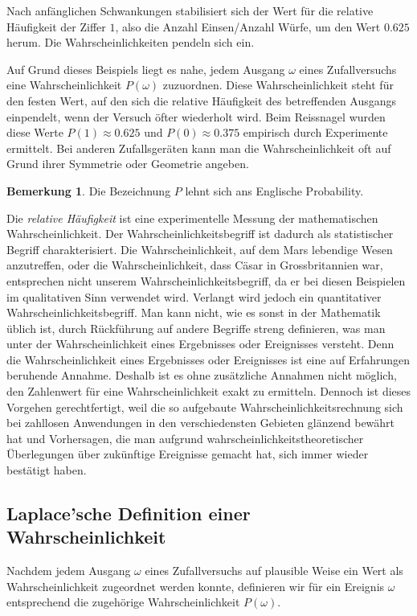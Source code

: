 \documentclass[%
<<<<<<< Updated upstream
11pt,%
twoside,%
titlepage,%
german,%
=======
11pt,%
twoside,%
titlepage,%
swissgerman,%
>>>>>>> Stashed changes
headsepline%
]{scrartcl}
\theoremstyle{definition}
\newtheorem{bem}{Bemerkung}[subsection] %
\theoremstyle{plain}
\newcounter{theo}[section]\setcounter{theo}{0}
\begin{document}
Nach anfänglichen Schwankungen stabilisiert sich der Wert für die relative Häufigkeit der Ziffer $1$, also die Anzahl Einsen/Anzahl Würfe, um den Wert $0.625$ herum. Die Wahrscheinlichkeiten \glqq pendeln sich ein\grqq.

Auf Grund dieses Beispiels liegt es nahe, jedem Ausgang $\omega$ eines Zufallversuchs eine Wahrscheinlichkeit $P(\omega)$ zuzuordnen. Diese Wahrscheinlichkeit steht für den festen Wert, auf den sich die relative Häufigkeit des betreffenden Ausgangs einpendelt, wenn der Versuch öfter wiederholt wird. Beim Reissnagel wurden diese Werte $P(1)\approx0.625$ und $P(0)\approx0.375$ empirisch durch Experimente ermittelt. Bei anderen Zufallsgeräten kann man die Wahrscheinlichkeit oft auf Grund ihrer Symmetrie oder Geometrie angeben.

\begin{bem}
Die Bezeichnung $P$ lehnt sich ans Englische Probability.
\end{bem}

Die \emph{relative Häufigkeit} ist eine experimentelle Messung der mathematischen Wahrscheinlichkeit. Der Wahrscheinlichkeitsbegriff ist dadurch als statistischer Begriff charakterisiert. Die Wahrscheinlichkeit, auf dem Mars lebendige Wesen anzutreffen, oder die Wahrscheinlichkeit, dass Cäsar in Grossbritannien war, entsprechen nicht unserem Wahrscheinlichkeitsbegriff, da er bei diesen Beispielen im qualitativen Sinn verwendet wird. Verlangt wird jedoch ein quantitativer Wahrscheinlichkeitsbegriff. Man kann nicht, wie es sonst in der Mathematik üblich ist, durch Rückführung auf andere Begriffe streng definieren, was man unter der Wahrscheinlichkeit eines Ergebnisses oder Ereignisses versteht. Denn die Wahrscheinlichkeit eines Ergebnisses oder Ereignisses ist eine auf Erfahrungen beruhende Annahme. Deshalb ist es ohne zusätzliche Annahmen nicht möglich, den Zahlenwert für eine Wahrscheinlichkeit exakt zu ermitteln. Dennoch ist dieses Vorgehen gerechtfertigt, weil die so aufgebaute Wahrscheinlichkeitsrechnung sich bei zahllosen Anwendungen in den verschiedensten Gebieten glänzend bewährt hat und Vorhersagen, die man aufgrund wahrscheinlichkeitstheoretischer Überlegungen über zukünftige Ereignisse gemacht hat, sich immer wieder bestätigt haben.

\subsection{Laplace'sche Definition einer Wahrscheinlichkeit}

Nachdem jedem Ausgang $\omega$ eines Zufallversuchs auf plausible Weise ein Wert als Wahrscheinlichkeit zugeordnet werden konnte, definieren wir für ein Ereignis $\omega$ entsprechend die zugehörige Wahrscheinlichkeit $P(\omega)$.
\end{document}
